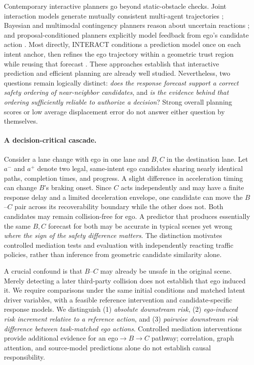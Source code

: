\documentclass[10pt]{article}
\begin{document}
Contemporary interactive planners go beyond static-obstacle checks. Joint interaction models generate mutually consistent multi-agent trajectories \parencite{luo2023jfp,huang2023gameformer}; Bayesian and multimodal contingency planners reason about uncertain reactions \parencite{mustafa2024racp}; and proposal-conditioned planners explicitly model feedback from ego's candidate action \parencite{yu2025hype}. Most directly, INTERACT conditions a prediction model once on each intent anchor, then refines the ego trajectory within a geometric trust region while reusing that forecast \parencite{distelzweig2026interact}. These approaches establish that interactive prediction and efficient planning are already well studied. Nevertheless, two questions remain logically distinct: \emph{does the response forecast support a correct safety ordering of near-neighbor candidates}, and \emph{is the evidence behind that ordering sufficiently reliable to authorize a decision}? Strong overall planning scores or low average displacement error do not answer either question by themselves.

\paragraph{A decision-critical cascade.}
Consider a lane change with ego in one lane and $B,C$ in the destination lane. Let $a^-$ and $a^+$ denote two legal, same-intent ego candidates sharing nearly identical paths, completion times, and progress. A slight difference in acceleration timing can change $B$'s braking onset. Since $C$ acts independently and may have a finite response delay and a limited deceleration envelope, one candidate can move the $B$--$C$ pair across its recoverability boundary while the other does not. Both candidates may remain collision-free for ego. A predictor that produces essentially the same $B,C$ forecast for both may be accurate in typical scenes yet wrong \emph{where the sign of the safety difference matters}. The distinction motivates controlled mediation tests and evaluation with independently reacting traffic policies, rather than inference from geometric candidate similarity alone.

A crucial confound is that $B$--$C$ may already be unsafe in the original scene. Merely detecting a later third-party collision does not establish that ego induced it. We require comparisons under the same initial conditions and matched latent driver variables, with a feasible reference intervention and candidate-specific response models. We distinguish (1) \emph{absolute downstream risk}, (2) \emph{ego-induced risk increment relative to a reference action}, and (3) \emph{pairwise downstream risk difference between task-matched ego actions}. Controlled mediation interventions provide additional evidence for an ego$\rightarrow B\rightarrow C$ pathway; correlation, graph attention, and source-model predictions alone do not establish causal responsibility.
\end{document}
